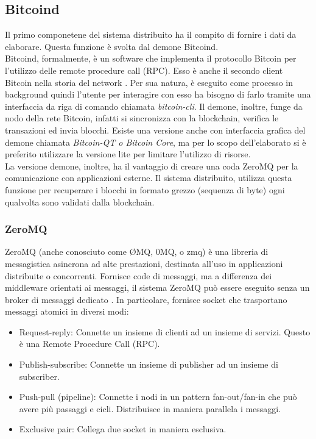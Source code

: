 \subsection{Bitcoind}
\label{sec:bitcoind}
Il primo componetene del sistema distribuito ha il compito di fornire i dati da elaborare. Questa funzione è svolta dal demone Bitcoind.
\\Bitcoind, formalmente, è un software che implementa il protocollo Bitcoin per l'utilizzo delle remote procedure call (RPC). Esso è anche il secondo client Bitcoin nella storia del network \cite{wiki:bitcoind}. Per sua natura, è eseguito come processo in background quindi l'utente per interagire con esso ha bisogno di farlo tramite una interfaccia da riga di comando chiamata \textit{bitcoin-cli}. Il demone, inoltre, funge da nodo della rete Bitcoin, infatti si sincronizza con la blockchain, verifica le transazioni ed invia blocchi. Esiste una versione anche con interfaccia grafica del demone chiamata \textit{Bitcoin-QT o Bitcoin Core}, ma per lo scopo dell'elaborato si è preferito utilizzare la versione lite per limitare l'utilizzo di risorse.
\\La versione demone, inoltre, ha il vantaggio di creare una coda ZeroMQ per la comunicazione con applicazioni esterne. Il sistema distribuito, utilizza questa funzione per recuperare i blocchi in formato grezzo (sequenza di byte) ogni qualvolta sono validati dalla blockchain.

\subsubsection{ZeroMQ}
\label{sec:ZMQ}
ZeroMQ (anche conosciuto come ØMQ, 0MQ, o zmq) è una libreria di messagistica asincrona ad alte prestazioni, destinata all'uso in applicazioni distribuite o concorrenti. Fornisce code di messaggi, ma a differenza dei middleware orientati ai messaggi, il sistema ZeroMQ può essere eseguito senza un broker di messaggi dedicato \cite{wiki:ZMQ}. In particolare, fornisce socket che trasportano messaggi atomici in diversi modi:
\begin{itemize}
\item Request-reply: Connette un insieme di clienti ad un insieme di servizi. Questo è una Remote Procedure Call (RPC).
\item Publish-subscribe: Connette un insieme di publisher ad un insieme di subscriber.
\item Push-pull (pipeline): Connette i nodi in un pattern fan-out/fan-in che può avere più passaggi e cicli. Distribuisce in maniera parallela i messaggi.
\item Exclusive pair: Collega due socket in maniera esclusiva.
\end{itemize} 
